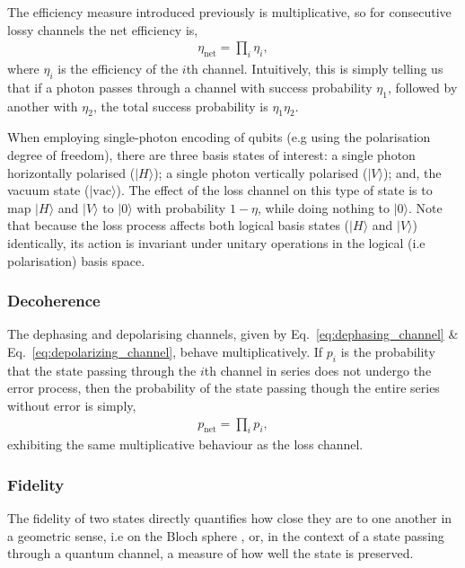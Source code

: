 \documentclass[aps,rmp,twocolumn,amsmath,amssymb,nofootinbib,superscriptaddress]{revtex4}
\newcommand{\ket}[1]{|#1\rangle}
\begin{document}
The efficiency measure introduced previously is multiplicative, so for consecutive lossy channels the net efficiency is,
\begin{align}
\eta_\mathrm{net}=\prod_i \eta_i,
\end{align}
where $\eta_i$ is the efficiency of the $i$th channel. Intuitively, this is simply telling us that if a photon passes through a channel with success probability $\eta_1$, followed by another with $\eta_2$, the total success probability is \mbox{$\eta_1\eta_2$}.

When employing single-photon encoding of qubits (e.g using the polarisation degree of freedom), there are three basis states of interest: a single photon horizontally polarised ($\ket{H}$); a single photon vertically polarised ($\ket{V}$); and, the vacuum state ($\ket{\mathrm{vac}}$). The effect of the loss channel on this type of state is to map $\ket{H}$ and $\ket{V}$ to $\ket{\mathrm{0}}$ with probability \mbox{$1-\eta$}, while doing nothing to $\ket{\mathrm{0}}$. Note that because the loss process affects both logical basis states ($\ket{H}$ and $\ket{V}$) identically, its action is invariant under unitary operations in the logical (i.e polarisation) basis space.

%
%

\subsubsection{Decoherence}

The dephasing and depolarising channels, given by Eq.~\ref{eq:dephasing_channel} \& Eq.~\ref{eq:depolarizing_channel}, behave multiplicatively. If $p_i$ is the probability that the state passing through the $i$th channel in series does not undergo the error process, then the probability of the state passing though the entire series without error is simply,
\begin{align}
p_\mathrm{net}=\prod_i p_i,
\end{align}
exhibiting the same multiplicative behaviour as the loss channel.

%
%

\subsubsection{Fidelity} \label{sec:fid_metric}

The fidelity of two states directly quantifies how close they are to one another in a geometric sense, i.e on the Bloch sphere \cite{???}, or, in the context of a state passing through a quantum channel, a measure of how well the state is preserved.
\end{document}

